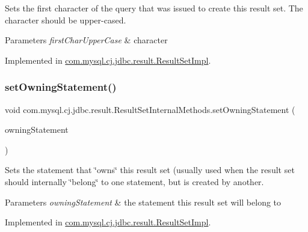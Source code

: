 Sets the first character of the query that was issued to create this result set. The character should be upper-\/cased.


\begin{DoxyParams}{Parameters}
{\em first\+Char\+Upper\+Case} & character \\
\hline
\end{DoxyParams}


Implemented in \mbox{\hyperlink{classcom_1_1mysql_1_1cj_1_1jdbc_1_1result_1_1_result_set_impl_ac9fac0fdfce19c2d4a1cb5ff55e03ec5}{com.\+mysql.\+cj.\+jdbc.\+result.\+Result\+Set\+Impl}}.

\mbox{\label{interfacecom_1_1mysql_1_1cj_1_1jdbc_1_1result_1_1_result_set_internal_methods_aaa893384996564b579f90c25c1c0e8c1}} 
\subsubsection{\texorpdfstring{set\+Owning\+Statement()}{setOwningStatement()}}
{\footnotesize\ttfamily void com.\+mysql.\+cj.\+jdbc.\+result.\+Result\+Set\+Internal\+Methods.\+set\+Owning\+Statement (\begin{DoxyParamCaption}\item[{\mbox{\hyperlink{interfacecom_1_1mysql_1_1cj_1_1jdbc_1_1_jdbc_statement}{Jdbc\+Statement}}}]{owning\+Statement }\end{DoxyParamCaption})}

Sets the statement that \char`\"{}owns\char`\"{} this result set (usually used when the result set should internally \char`\"{}belong\char`\"{} to one statement, but is created by another.


\begin{DoxyParams}{Parameters}
{\em owning\+Statement} & the statement this result set will belong to \\
\hline
\end{DoxyParams}


Implemented in \mbox{\hyperlink{classcom_1_1mysql_1_1cj_1_1jdbc_1_1result_1_1_result_set_impl_a057575337f0438e794595d47b68f5f8a}{com.\+mysql.\+cj.\+jdbc.\+result.\+Result\+Set\+Impl}}.

